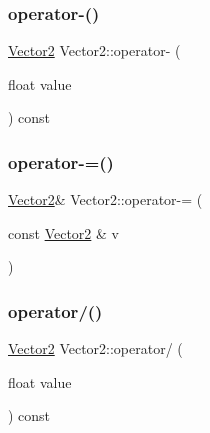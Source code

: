 \mbox{\label{class_vector2_a61536f1f59620db393c5f2acfcca03fd}} 
\subsubsection{\texorpdfstring{operator-\/()}{operator-()}\hspace{0.1cm}{\footnotesize\ttfamily [2/2]}}
{\footnotesize\ttfamily \mbox{\hyperlink{class_vector2}{Vector2}} Vector2\+::operator-\/ (\begin{DoxyParamCaption}\item[{float}]{value }\end{DoxyParamCaption}) const\hspace{0.3cm}{\ttfamily [inline]}}

\mbox{\label{class_vector2_a6e6eb4f1223208bf5329e5f51c150f81}} 
\subsubsection{\texorpdfstring{operator-\/=()}{operator-=()}}
{\footnotesize\ttfamily \mbox{\hyperlink{class_vector2}{Vector2}}\& Vector2\+::operator-\/= (\begin{DoxyParamCaption}\item[{const \mbox{\hyperlink{class_vector2}{Vector2}} \&}]{v }\end{DoxyParamCaption})\hspace{0.3cm}{\ttfamily [inline]}}

\mbox{\label{class_vector2_ab3ac0b0ef996e4931a801dc54e490472}} 
\subsubsection{\texorpdfstring{operator/()}{operator/()}\hspace{0.1cm}{\footnotesize\ttfamily [1/2]}}
{\footnotesize\ttfamily \mbox{\hyperlink{class_vector2}{Vector2}} Vector2\+::operator/ (\begin{DoxyParamCaption}\item[{float}]{value }\end{DoxyParamCaption}) const\hspace{0.3cm}{\ttfamily [inline]}}

